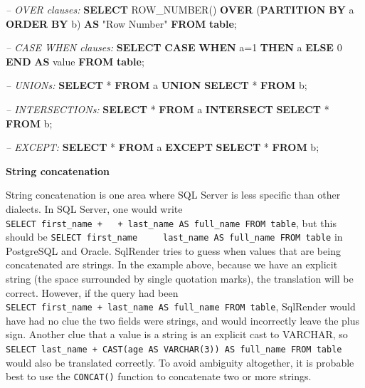 \documentclass[11pt]{book}
\newenvironment{Shaded}{\begin{snugshade}}{\end{snugshade}}
\newcommand{\KeywordTok}[1]{\textcolor[rgb]{0.13,0.29,0.53}{\textbf{#1}}}
\newcommand{\DecValTok}[1]{\textcolor[rgb]{0.00,0.00,0.81}{#1}}
\newcommand{\CommentTok}[1]{\textcolor[rgb]{0.56,0.35,0.01}{\textit{#1}}}
\newcommand{\OtherTok}[1]{\textcolor[rgb]{0.56,0.35,0.01}{#1}}
\newcommand{\FunctionTok}[1]{\textcolor[rgb]{0.00,0.00,0.00}{#1}}
\newcommand{\NormalTok}[1]{#1}
\begin{document}
\begin{Shaded}
\begin{Highlighting}[]
\CommentTok{-- OVER clauses:}
\KeywordTok{SELECT} \FunctionTok{ROW_NUMBER}\NormalTok{() }\KeywordTok{OVER}\NormalTok{ (}\KeywordTok{PARTITION} \KeywordTok{BY}\NormalTok{ a }\KeywordTok{ORDER} \KeywordTok{BY}\NormalTok{ b)}
  \KeywordTok{AS} \OtherTok{"Row Number"} \KeywordTok{FROM} \KeywordTok{table}\NormalTok{;}
  
\CommentTok{-- CASE WHEN clauses:}
\KeywordTok{SELECT} \KeywordTok{CASE} \KeywordTok{WHEN}\NormalTok{ a=}\DecValTok{1} \KeywordTok{THEN}\NormalTok{ a }\KeywordTok{ELSE} \DecValTok{0} \KeywordTok{END} \KeywordTok{AS} \FunctionTok{value} \KeywordTok{FROM} \KeywordTok{table}\NormalTok{;}

\CommentTok{-- UNIONs:}
\KeywordTok{SELECT}\NormalTok{ * }\KeywordTok{FROM}\NormalTok{ a }\KeywordTok{UNION} \KeywordTok{SELECT}\NormalTok{ * }\KeywordTok{FROM}\NormalTok{ b;}

\CommentTok{-- INTERSECTIONs:}
\KeywordTok{SELECT}\NormalTok{ * }\KeywordTok{FROM}\NormalTok{ a }\KeywordTok{INTERSECT} \KeywordTok{SELECT}\NormalTok{ * }\KeywordTok{FROM}\NormalTok{ b;}

\CommentTok{-- EXCEPT:}
\KeywordTok{SELECT}\NormalTok{ * }\KeywordTok{FROM}\NormalTok{ a }\KeywordTok{EXCEPT} \KeywordTok{SELECT}\NormalTok{ * }\KeywordTok{FROM}\NormalTok{ b;}
\end{Highlighting}
\end{Shaded}

\textbf{String concatenation}

String concatenation is one area where SQL Server is less specific than
other dialects. In SQL Server, one would write
\texttt{SELECT\ first\_name\ +\ \textquotesingle{}\ \textquotesingle{}\ +\ last\_name\ AS\ full\_name\ FROM\ table},
but this should be
\texttt{SELECT\ first\_name\ \textbar{}\textbar{}\ \textquotesingle{}\ \textquotesingle{}\ \textbar{}\textbar{}\ last\_name\ AS\ full\_name\ FROM\ table}
in PostgreSQL and Oracle. SqlRender tries to guess when values that are
being concatenated are strings. In the example above, because we have an
explicit string (the space surrounded by single quotation marks), the
translation will be correct. However, if the query had been
\texttt{SELECT\ first\_name\ +\ last\_name\ AS\ full\_name\ FROM\ table},
SqlRender would have had no clue the two fields were strings, and would
incorrectly leave the plus sign. Another clue that a value is a string
is an explicit cast to VARCHAR, so
\texttt{SELECT\ last\_name\ +\ CAST(age\ AS\ VARCHAR(3))\ AS\ full\_name\ FROM\ table}
would also be translated correctly. To avoid ambiguity altogether, it is
probable best to use the \texttt{CONCAT()} function to concatenate two
or more strings.
\end{document}
